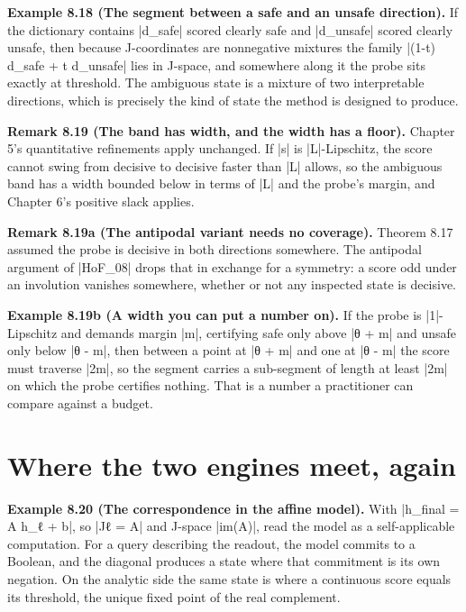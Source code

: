 \documentclass{memoir}
\begin{document}
\textbf{Example 8.18 (The segment between a safe and an unsafe direction).} If the dictionary
contains \LeanVerb|d_safe| scored clearly safe and \LeanVerb|d_unsafe| scored clearly unsafe, then
because J-coordinates are nonnegative mixtures the family \LeanVerb|(1-t) d_safe + t d_unsafe|
lies in J-space, and somewhere along it the probe sits exactly at threshold. The
ambiguous state is a mixture of two interpretable directions, which is precisely
the kind of state the method is designed to produce.

\textbf{Remark 8.19 (The band has width, and the width has a floor).} Chapter 5's
quantitative refinements apply unchanged. If \LeanVerb|s| is \LeanVerb|L|-Lipschitz, the score
cannot swing from decisive to decisive faster than \LeanVerb|L| allows, so the ambiguous
band has a width bounded below in terms of \LeanVerb|L| and the probe's margin, and
Chapter 6's positive slack applies.

\textbf{Remark 8.19a (The antipodal variant needs no coverage).} Theorem 8.17 assumed the
probe is decisive in both directions somewhere. The antipodal argument of
\LeanVerb|HoF_08| drops that in exchange for a symmetry: a score odd under an involution
vanishes somewhere, whether or not any inspected state is decisive.

\textbf{Example 8.19b (A width you can put a number on).} If the probe is \LeanVerb|1|-Lipschitz and
demands margin \LeanVerb|m|, certifying safe only above \LeanVerb|θ + m| and unsafe only below \LeanVerb|θ - m|,
then between a point at \LeanVerb|θ + m| and one at \LeanVerb|θ - m| the score must traverse \LeanVerb|2m|,
so the segment carries a sub-segment of length at least \LeanVerb|2m| on which the probe
certifies nothing. That is a number a practitioner can compare against a budget.



\section{Where the two engines meet, again}\label{Two--Schemas--of--Impossibility-005F-005F-005F--Machine--Checked--Limits--of--Trustworthy--Machine--Learning-005F-005F-005F--and--Why--They--Tighten--with--Capability----J--Space-005F-005F-005F--and--Why--It--Does--Not--Escape----Where--the--two--engines--meet-005F-005F-005F--again}

\textbf{Example 8.20 (The correspondence in the affine model).} With \LeanVerb|h_final = A h_ℓ + b|,
so \LeanVerb|Jℓ = A| and J-space \LeanVerb|im(A)|, read the model as a self-applicable
computation. For a query describing the readout, the model commits to a Boolean,
and the diagonal produces a state where that commitment is its own negation. On
the analytic side the same state is where a continuous score equals its
threshold, the unique fixed point of the real complement.
\end{document}
